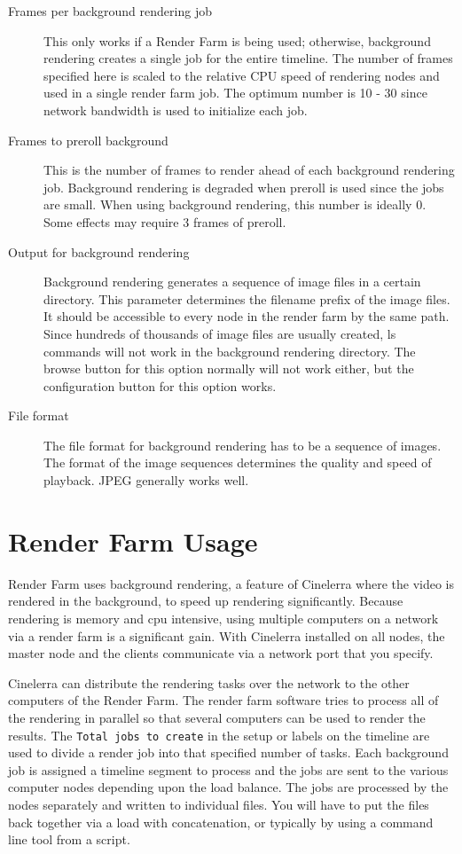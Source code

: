 \begin{description}
    \item[Frames per background rendering job] This only works if a Render Farm is being used; otherwise, background rendering creates a single job for the entire timeline. The number of frames specified here is scaled to the relative CPU speed of rendering nodes and used in a single render farm job. The optimum number is 10 - 30 since network bandwidth is used to initialize each job.
    \item[Frames to preroll background] This is the number of frames to render ahead of each background rendering job. Background rendering is degraded when preroll is used since the jobs are small. When using background rendering, this number is ideally 0. Some effects may require 3 frames of preroll.
    \item[Output for background rendering] Background rendering generates a sequence of image files in a certain directory. This parameter determines the filename prefix of the image files. It should be accessible to every node in the render farm by the same path. Since hundreds of thousands of image files are usually created, ls commands will not work in the background rendering directory. The browse button for this option normally will not work either, but the configuration button for this option works.
    \item[File format] The file format for background rendering has to be a sequence of images. The format of the image sequences determines the quality and speed of playback. JPEG generally works well.
\end{description}

\section{Render Farm Usage}%
\label{sec:render_farm_usage}

Render Farm uses background rendering, a feature of Cinelerra where the video is rendered in the background, to speed up rendering significantly.  Because rendering is memory and cpu intensive, using multiple computers on a network via a render farm is a significant gain.  With Cinelerra installed on all nodes, the master node and the clients communicate via a network port that you specify. 

Cinelerra can distribute the rendering tasks over the network to the other computers of the Render Farm.  The render farm software tries to process all of the rendering in parallel so that several computers can be used to render the results.  The \texttt{Total jobs to create} in the setup or labels on the timeline are used to divide a render job into that specified number of tasks.  Each background job is assigned a timeline segment to process and the jobs are sent to the various computer nodes depending upon the load balance.  The jobs are processed by the nodes separately and written to individual files.  You will have to put the files back together via a load with concatenation, or typically by using a command line tool from a script.

